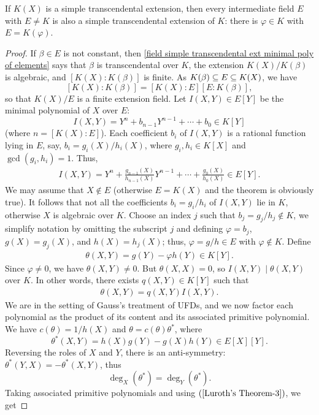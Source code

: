 \begin{theorem}
If $K(X)$ is a simple transcendental extension, then every intermediate field $E$ with $E\neq K$ is also a simple transcendental extension of $K$: there is $\varphi\in K$ with $E=K(\varphi)$.
\end{theorem}
\begin{proof}
If $\beta\in E$ is not constant, then \cref{field simple transcendental ext minimal poly of elements} says that $\beta$ is transcendental over $K$, the extension $K(X)/K(\beta)$ is algebraic, and $[K(X):K(\beta)]$ is finite. As $K(\beta)\subseteq E\subseteq K(X)$, we have
\[[K(X):K(\beta)]=[K(X):E][E:K(\beta)],\]
so that $K(X)/E$ is a finite extension field. Let $I(X,Y)\in E[Y]$ be the minimal polynomial of $X$ over $E$:
\[I(X,Y)=Y^n+b_{n-1}Y^{n-1}+\cdots+b_0\in K[Y]\]
(where $n=[K(X):E]$). Each coefficient $b_i$ of $I(X,Y)$ is a rational function lying in $E$, say, $b_i=g_i(X)/h_i(X)$, where $g_i,h_i\in K[X]$ and $\gcd(g_i,h_i)=1$. Thus,
\begin{align}\label{Luroth's Theorem-1}
I(X,Y)=Y^n+\frac{g_{n-1}(X)}{h_{n-1}(X)}Y^{n-1}+\cdots+\frac{g_0(X)}{h_0(X)}\in E[Y].
\end{align}
We may assume that $X\notin E$ (otherwise $E=K(X)$ and the theorem is obviously true). It follows that not all the coefficients $b_i=g_i/h_i$ of $I(X,Y)$ lie in $K$, otherwise $X$ is algebraic over $K$. Choose an index $j$ such that $b_j=g_j/h_j\notin K$, we simplify notation by omitting the subscript $j$ and defining $\varphi=b_j$, $g(X)=g_j(X)$, and $h(X)=h_j(X)$; thus, $\varphi=g/h\in E$ with $\varphi\notin K$. Define
\begin{align}\label{Luroth's Theorem-2}
\theta(X,Y)=g(Y)-\varphi h(Y)\in K[Y].
\end{align}
Since $\varphi\neq 0$, we have $\theta(X,Y)\neq 0$. But $\theta(X,X)=0$, so $I(X,Y)\mid\theta(X,Y)$ over $K$. In other words, there exists $q(X,Y)\in K[Y]$ such that
\begin{align}\label{Luroth's Theorem-3}
\theta(X,Y)=q(X,Y)I(X,Y).
\end{align}
We are in the setting of Gauss's treatment of UFDs, and we now factor each polynomial as the product of its content and its associated primitive polynomial. We have $c(\theta)=1/h(X)$ and $\theta=c(\theta)\theta^*$, where
\[\theta^*(X,Y)=h(X)g(Y)-g(X)h(Y)\in E[X][Y].\]
Reversing the roles of $X$ and $Y$, there is an anti-symmetry: $\theta^*(Y,X)=-\theta^*(X,Y)$, thus
\[\deg_X(\theta^*)=\deg_Y(\theta^*).\]
Taking associated primitive polynomials and using $(\ref{Luroth's Theorem-3})$, we get

\end{proof}
